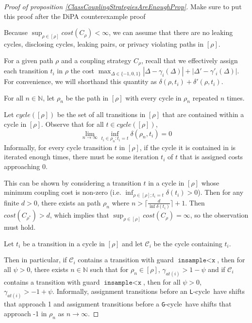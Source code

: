 \documentclass[12pt]{article}
\newcommand{\NN}{\mathbb{N}}
\newcommand{\lguard}[1][x]{\texttt{insample} < #1}
\newcommand{\gcycle}{\texttt{G}-cycle}
\newcommand{\lcycle}{\texttt{L}-cycle}
\theoremstyle{definition}
\begin{document}
\begin{proof}[Proof of proposition \ref{ClassCouplingStrategiesAreEnoughProp}]
    
    {\color{red} Make sure to put this proof after the DiPA counterexample proof}

    Because $\sup_{\rho\in [\rho]}cost(C_\rho)< \infty$, we can assume that there are no leaking cycles, disclosing cycles, leaking pairs, or privacy violating paths in $[\rho]$.


    For a given path $\rho$ and a coupling strategy $C_\rho$, recall that we effectively assign each transition $t_i$ in $\rho$ the cost $\max_{\Delta \in \{-1, 0, 1\}}|\Delta - \gamma_i(\Delta)| + |\Delta' - \gamma'_i(\Delta)|$. For convenience, we will shorthand this quantity as $\delta(\rho, t_i) + \delta'(\rho, t_i)$.


    For all $n\in \NN$, let $\rho_n$ be the path in $[\rho]$ with every cycle in $\rho_n$ repeated $n$ times. 

   Let $cycle([\rho])$ be the set of all transitions in $[\rho]$ that are contained within a cycle in $[\rho]$. Observe that for all $t\in cycle([\rho])$, \[
        \lim_{n\to\infty}\inf_{t_i\in\rho_n: t_i=t} \delta(\rho_n, t_i) = 0
    \]
    Informally, for every cycle transition $t$ in $[\rho]$, if the cycle it is contained in is iterated enough times, there must be some iteration $t_i$ of $t$ that is assigned costs approaching 0. 

    This can be shown by considering a transition $t$ in a cycle in $[\rho]$ whose minimum coupling cost is non-zero (i.e. $\inf_{\rho\in[\rho]; t_i=t} \delta(t_i) > 0$). Then for any finite $d>0$, there exists an path $\rho_n$ where $n>\lceil\frac{d}{\inf\delta(t_i)}\rceil+1$. Then $cost(C_{\rho^*})>d$, which implies that $\sup_{\rho\in [\rho]}cost(C_\rho) = \infty$, so the observation must hold. 

    Let $t_i$ be a transition in a cycle in $[\rho]$ and let $\mathcal{C}_i$ be the cycle containing $t_i$. 

    Then in particular, if $\mathcal{C}_i$ contains a transition with guard $\lguard[\texttt{x}]$, then for all $\psi>0$, there exists $n\in \NN$ such that for $\rho_n\in [\rho]$, $\gamma_{at(i)}> 1-\psi$ and if $\mathcal{C}_i$ contains a transition with guard $\lguard[\texttt{x}]$, then for all $\psi>0$, $\gamma_{at(i)}> -1+\psi$. 
    Informally, assignment transitions before an \lcycle\ have shifts that approach 1 and assignment transitions before a \gcycle\ have shifts that approach -1 in $\rho_n$ as $n\to\infty$. 


\end{proof}
\end{document}
